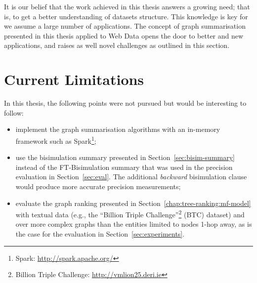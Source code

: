 It is our belief that the work achieved in this thesis answers a growing need; that is, to get a better understanding of datasets structure. This knowledge is key for we assume a large number of applications. The concept of graph summarisation presented in this thesis applied to Web Data opens the door to better and new applications, and raises as well novel challenges as outlined in this section.

\section{Current Limitations}

In this thesis, the following points were not pursued but would be interesting to follow:
\begin{itemize}
	\item implement the graph summarisation algorithms with an in-memory framework such as Spark\footnote{Spark: \url{http://spark.apache.org/}};
	\item use the bisimulation summary presented in Section~\ref{sec:bisim-summary} instead of the FT-Bisimulation summary that was used in the precision evaluation in Section~\ref{sec:eval}. The additional \emph{backward} bisimulation clause would produce more accurate precision measurements;
	\item evaluate the graph ranking presented in Section~\ref{chap:tree-ranking:mf-model} with textual data (e.g., the ``Billion Triple Challenge''\footnote{Billion Triple Challenge: \url{http://vmlion25.deri.ie}} (BTC) dataset) and over more complex graphs than the entities limited to nodes 1-hop away, as is the case for the evaluation in Section~\ref{sec:experiments}.
\end{itemize}
